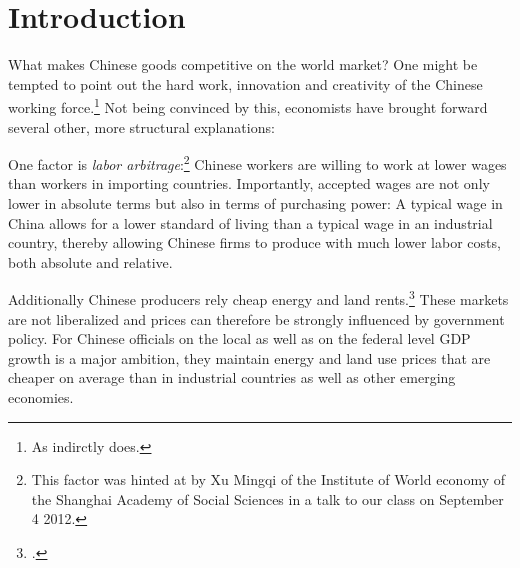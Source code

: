 \section{Introduction}

What makes Chinese goods competitive on the world market? One might be 
tempted to point out the hard work, innovation and creativity of the 
Chinese working force.\footnote{As \cite[p. 18]{Yu2010} indirctly does.} 
Not being convinced by this, economists have brought forward several 
other, more structural explanations:

One factor is \emph{labor arbitrage}:\footnote{This factor was hinted at 
by Xu Mingqi of the Institute of World economy of the Shanghai Academy 
of Social Sciences in a talk to our class on September 4 2012.} Chinese 
workers are willing to work at lower wages than workers in importing 
countries. Importantly, accepted wages are not only lower in absolute 
terms but also in terms of purchasing power: A typical wage in China 
allows for a lower standard of living than a typical wage in an 
industrial country, thereby allowing Chinese firms to produce with much 
lower labor costs, both absolute and relative. 

Additionally Chinese producers rely cheap energy and land 
rents.\footnote{\cite[pp.  25]{Huang2010}.} These markets are not 
liberalized and prices can therefore be strongly influenced by 
government policy. For Chinese officials on the local as well as on the 
federal level GDP growth is a major ambition, they maintain energy and 
land use prices that are cheaper on average than in industrial countries 
as well as other emerging economies.



